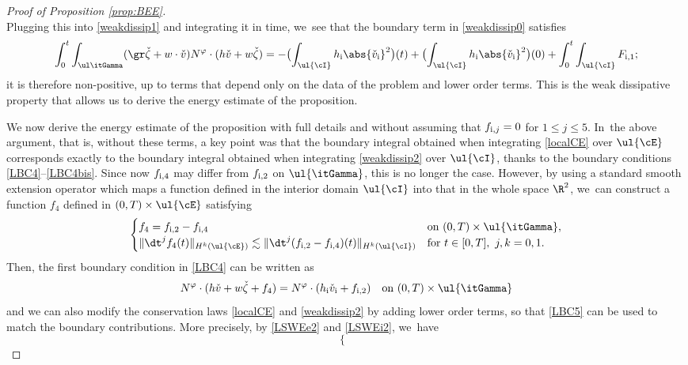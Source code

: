 \begin{proof}[Proof of Proposition \ref{prop:BEE}]
\[\]
Plugging this into \eqref{weakdissip1} and integrating it in time, we~see that the boundary term in \eqref{weakdissip0} satisfies
\[
\int_0^t \int_{\ul\itGamma} (\gr\check{\zeta}+w\cdot\check{v}) N^\varphi\cdot (h\check{v}+w\check{\zeta})
= - \bigl(\int_{\ul{\cI}} h_\mathrm{i}\abs{\check{v}_\mathrm{i}}^2\bigr)(t)
+ \bigl(\int_{\ul{\cI}} h_\mathrm{i}\abs{\check{v}_\mathrm{i}}^2\bigr)(0)+\int_0^t \int_{\ul{\cI}}F_\mathrm{i,1};
\]
it is therefore non-positive, up to terms that depend only on the data of the problem and lower order terms.
This is the weak dissipative property that allows us to derive the energy estimate of the proposition.

We now derive the energy estimate of the proposition with full details and without assuming that $f_{{\rm i},j}=0$ for $1\leq j\leq 5$. In~the above argument, that is, without these terms, a key point was that the boundary integral obtained when integrating \eqref{localCE} over $\ul{\cE}$
corresponds exactly to the boundary integral obtained when integrating \eqref{weakdissip2} over $\ul{\cI}$,
thanks to the boundary conditions \eqref{LBC4}--\eqref{LBC4bis}.
Since now $f_{{\rm i},4}$ may differ from $f_{{\rm i},2}$ on $\ul{\itGamma}$, this is no longer the case.
However, by using a standard smooth extension operator which maps a function defined in the interior domain $\ul{\cI}$ into that in the whole space $\R^2$, we~can construct a function $f_4$ defined in $(0,T)\times\ul{\cE}$ satisfying
\begin{equation}\label{Ext1}
\begin{cases}
f_4 = f_{{\rm i},2}-f_{{\rm i},4} &\text{on } (0,T)\times\ul{\itGamma}, \\
\|\dt^jf_4(t)\|_{H^k(\ul{\cE})} \lesssim \|\dt^j(f_{{\rm i},2}-f_{{\rm i},4})(t)\|_{H^k(\ul{\cI})} &\text{for } t\in[0,T], \ j,k=0,1.
\end{cases}
\end{equation}
Then, the first boundary condition in \eqref{LBC4} can be written as
\begin{equation}\label{LBC5}
N^\varphi\cdot(h\check{v}+w\check{\zeta}+f_4) = N^\varphi\cdot(h_\mathrm{i}\check{v}_\mathrm{i}+f_{{\rm i},2}) \quad\text{on } (0,T)\times\ul{\itGamma}
\end{equation}
and we can also modify the conservation laws \eqref{localCE} and \eqref{weakdissip2} by adding lower order terms,
so that \eqref{LBC5} can be used to match the boundary contributions.
More precisely, by \eqref{LSWEe2} and \eqref{LSWEi2}, we~have
\[
\begin{cases}

\end{cases}\]
\end{proof}
